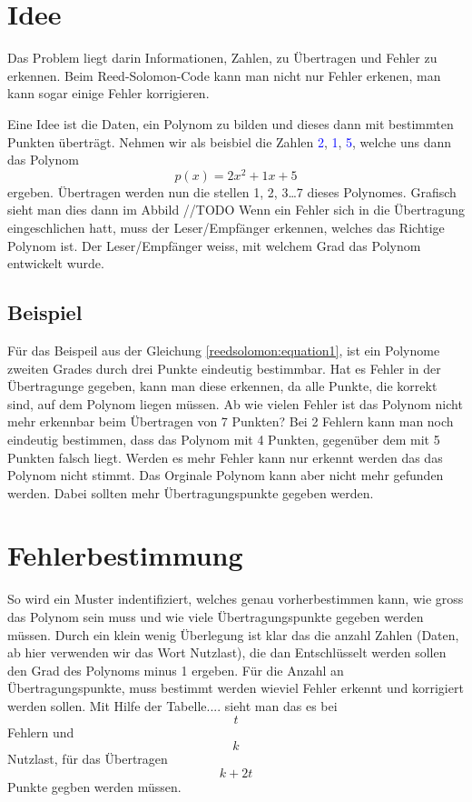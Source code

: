 %
%
%
\section{Idee
\label{reedsolomon:section:idee}}
Das Problem liegt darin Informationen, Zahlen, 
zu Übertragen und Fehler zu erkennen.
Beim Reed-Solomon-Code kann man nicht nur Fehler erkenen, 
man kann sogar einige Fehler korrigieren.

Eine Idee ist die Daten, 
ein Polynom zu bilden und dieses dann mit bestimmten Punkten überträgt.
Nehmen wir als beisbiel die Zahlen \textcolor{blue}{2}, \textcolor{blue}{1}, \textcolor{blue}{5},
welche uns dann das Polynom 
\begin{equation}
p(x)
=
2x^2 + 1x + 5 
\label{reedsolomon:equation1}
\end{equation}
ergeben.
Übertragen werden nun die stellen 1, 2, 3\dots 7 dieses Polynomes.
Grafisch sieht man dies dann im Abbild //TODO
Wenn ein Fehler sich in die Übertragung eingeschlichen hatt, muss der Leser/Empfänger erkennen, welches das Richtige Polynom ist.
Der Leser/Empfänger weiss, mit welchem Grad das Polynom entwickelt wurde. 
\subsection{Beispiel}
Für das Beispeil aus der Gleichung \ref{reedsolomon:equation1},
ist ein Polynome zweiten Grades durch drei Punkte eindeutig bestimmbar.
Hat es Fehler in der Übertragunge gegeben, kann man diese erkennen,
da alle Punkte, die korrekt sind, auf dem Polynom liegen müssen.
Ab wie vielen Fehler ist das Polynom nicht mehr erkennbar beim Übertragen von 7 Punkten?
Bei 2 Fehlern kann man noch eindeutig bestimmen, dass das Polynom mit 4 Punkten,
gegenüber dem mit 5 Punkten falsch liegt.
Werden es mehr Fehler kann nur erkennt werden das das Polynom nicht stimmt.
Das Orginale Polynom kann aber nicht mehr gefunden werden.
Dabei sollten mehr Übertragungspunkte gegeben werden.

\section{Fehlerbestimmung
\label{reedsolomon:section:Fehlerbestimmmung}}
So wird ein Muster indentifiziert, welches genau vorherbestimmen kann,
wie gross das Polynom sein muss und wie viele Übertragungspunkte gegeben werden müssen.
Durch ein klein wenig Überlegung ist klar das die anzahl Zahlen (Daten, ab hier verwenden wir das Wort Nutzlast),
die dan Entschlüsselt werden sollen den Grad des Polynoms minus 1 ergeben.
Für die Anzahl an Übertragungspunkte, muss bestimmt werden wieviel Fehler erkennt und korrigiert werden sollen.
Mit Hilfe der Tabelle.... sieht man das es bei $$t$$ Fehlern und $$k$$ Nutzlast,
für das Übertragen $$k+2t$$ Punkte gegben werden müssen.

